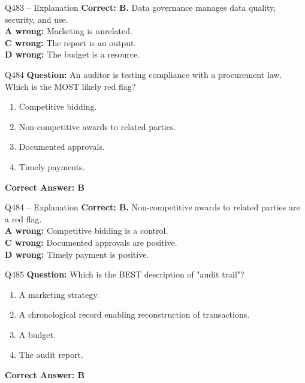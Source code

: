 \documentclass[aspectratio=169,10pt]{beamer}
\begin{document}
	\begin{frame}[t]{Q483 -- Explanation}
		\small
		\textbf{Correct: B.} Data governance manages data quality, security, and use. \\[4pt]
		\textbf{A wrong:} Marketing is unrelated. \\[2pt]
		\textbf{C wrong:} The report is an output. \\[2pt]
		\textbf{D wrong:} The budget is a resource.
	\end{frame}
	
	\begin{frame}[t]{Q484}
		\small
		\textbf{Question:} An auditor is testing compliance with a procurement law. Which is the MOST likely red flag?
		\begin{enumerate}[label=\Alph*.,itemsep=1pt,topsep=2pt]
			\item Competitive bidding.
			\item Non-competitive awards to related parties.
			\item Documented approvals.
			\item Timely payments.
		\end{enumerate}
		\vspace{4pt}
		\textbf{Correct Answer: B}
	\end{frame}
	
	\begin{frame}[t]{Q484 -- Explanation}
		\small
		\textbf{Correct: B.} Non-competitive awards to related parties are a red flag. \\[4pt]
		\textbf{A wrong:} Competitive bidding is a control. \\[2pt]
		\textbf{C wrong:} Documented approvals are positive. \\[2pt]
		\textbf{D wrong:} Timely payment is positive.
	\end{frame}
	
	\begin{frame}[t]{Q485}
		\small
		\textbf{Question:} Which is the BEST description of "audit trail"?
		\begin{enumerate}[label=\Alph*.,itemsep=1pt,topsep=2pt]
			\item A marketing strategy.
			\item A chronological record enabling reconstruction of transactions.
			\item A budget.
			\item The audit report.
		\end{enumerate}
		\vspace{4pt}
		\textbf{Correct Answer: B}
	\end{frame}
	
\end{document}

